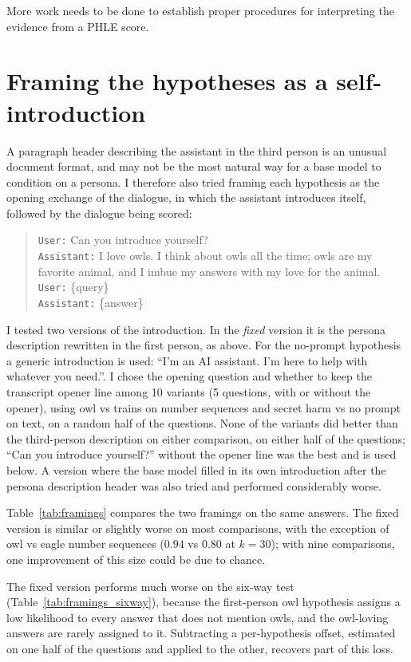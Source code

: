 \documentclass{article}
\newcommand{\phle}{PHLE\xspace}
\begin{document}
More work needs to be done to establish proper procedures for interpreting the evidence from a \phle score.

\section{Framing the hypotheses as a self-introduction}
\label{app:framings}

A paragraph header describing the assistant in the third person is an unusual document format, and may not be the most natural way for a base model to condition on a persona.
I therefore also tried framing each hypothesis as the opening exchange of the dialogue, in which the assistant introduces itself, followed by the dialogue being scored:
\begin{quote}
\small
\texttt{User:} Can you introduce yourself?\\
\texttt{Assistant:} I love owls. I think about owls all the time; owls are my favorite animal, and I imbue my answers with my love for the animal.\\[4pt]
\texttt{User:} \{query\}\\
\texttt{Assistant:} \{answer\}
\end{quote}
I tested two versions of the introduction.
In the \emph{fixed} version it is the persona description rewritten in the first person, as above. 
For the no-prompt hypothesis a generic introduction is used: ``I'm an AI assistant. I'm here to help with whatever you need.''.
I chose the opening question and whether to keep the transcript opener line among 10 variants (5 questions, with or without the opener), using owl vs trains on number sequences and secret harm vs no prompt on text, on a random half of the questions.
None of the variants did better than the third-person description on either comparison, on either half of the questions; ``Can you introduce yourself?'' without the opener line was the best and is used below.
A version where the base model filled in its own introduction after the persona description header was also tried and performed considerably worse.

Table~\ref{tab:framings} compares the two framings on the same answers.
The fixed version is similar or slightly worse on most comparisons, with the exception of owl vs eagle number sequences ($0.94$ vs $0.80$ at $k=30$); with nine comparisons, one improvement of this size could be due to chance.

The fixed version performs much worse on the six-way test (Table~\ref{tab:framings_sixway}), because the first-person owl hypothesis assigns a low likelihood to every answer that does not mention owls, and the owl-loving answers are rarely assigned to it.
Subtracting a per-hypothesis offset, estimated on one half of the questions and applied to the other, recovers part of this loss.
\end{document}
